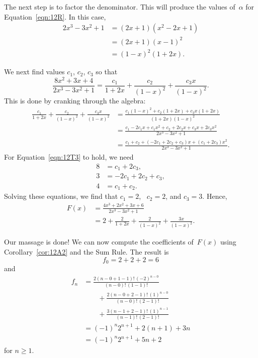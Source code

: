 The next step is to factor the denominator.  This will produce the
values of~$\alpha$ for Equation~\ref{eqn:12R}.  In this case,
\begin{align*}
2 x^3 - 3 x^2 + 1
    &= (2 x + 1) (x^2 - 2 x + 1) \\
    &= (2 x + 1) (x - 1)^2 \\
    &= (1 - x)^2 (1 + 2 x).
\end{align*}

We next find values $c_1$, $c_2$, $c_3$ so that
\begin{equation}\label{eqn:12T3}
\frac{ 8 x^2 + 3 x + 4 }{ 2 x^3 - 3 x^2 + 1 }
    = \frac{c_1}{1 + 2x} + \frac{c_2}{(1 - x)^2} + \frac{c_3 x}{(1 - x)^2}.
\end{equation}
This is done by cranking through the algebra:
\begingroup
\openup 3pt
\begin{align*}
\frac{c_1}{1 + 2x} + \frac{c_2}{(1 - x)^2} + \frac{c_3 x}{(1 - x)^2}
    &= \frac{c_1 (1 - x)^2 + c_2 (1 + 2x) + c_3 x (1 + 2x)}
            {(1 + 2x) (1 - x)^2} \\
    &= \frac{c_1 - 2 c_1 x + c_1 x^2 + c_2 + 2 c_2 x + c_3 x + 2 c_3 x^2}
            {2 x^3 - 3 x^2 + 1} \\
    &= \frac{c_1 + c_2 + (-2 c_1 + 2 c_2 + c_3) x + (c_1 + 2 c_3)x^2}
            {2 x^3 - 3 x^2 + 1}.
\end{align*}
\endgroup
For Equation~\ref{eqn:12T3} to hold, we need
\begin{align*}
    8 &= c_1 + 2 c_3, \\
    3 &= -2 c_1 + 2 c_2 + c_3, \\
    4 &= c_1 + c_2.
\end{align*}
Solving these equations, we find that $c_1 = 2$, \ $c_2 = 2$, and $c_3
= 3$.  Hence,
\begin{align*}
F(x)    &= \frac{ 4 x^3 + 2 x^2 + 3 x + 6 }{2 x^3 - 3 x^2 + 1} \\[2pt]
        &= 2 + \frac{2}{1 + 2x} + \frac{2}{(1 - x)^2} + \frac{3x}{(1 - x)^2}.
\end{align*}

Our massage is done!  We can now compute the coefficients of~$F(x)$
using Corollary~\ref{cor:12A2} and the Sum Rule.  The result is
\begin{equation*}
    f_0 = 2 + 2 + 2 = 6
\end{equation*}
and
\begingroup
\openup 3pt
\begin{align*}
f_n &= \frac{ 2 (n - 0 + 1 - 1)!\, (-2)^{n - 0} }{ (n - 0)! \, (1 - 1)!} \\
&\qquad + \frac{ 2 (n - 0 + 2 - 1)!\, (1)^{n - 0}  }{ (n - 0)! \, (2 - 1)!} \\
&\qquad + \frac{ 3 (n - 1 + 2 - 1)!\, (1)^{n - 1}  }{ (n - 1)! \, (2 - 1)!}\\
    &= (-1)^n 2^{n + 1} + 2 (n + 1) + 3 n \\
    &= (-1)^n 2^{n + 1} + 5 n + 2
\end{align*}
\endgroup
for $n \ge 1$.

